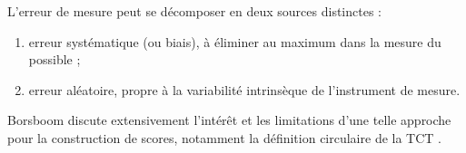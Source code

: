 L'erreur de mesure peut se décomposer en deux sources distinctes :
\begin{enumerate}
\item erreur systématique (ou biais), à éliminer au maximum dans la mesure du
  possible ; 
\item erreur aléatoire, propre à la variabilité intrinsèque de l'instrument de
  mesure. 
\end{enumerate}

Borsboom discute extensivement l'intérêt et les limitations d'une telle approche
pour la construction de scores, notamment la définition circulaire de la TCT \autocite{Borsboom2006,Borsboom2005}.











